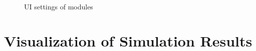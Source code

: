 \documentclass[fleqn,11pt,openany]{book}
\begin{document}
\begin{figure}
\caption{UI settings of modules}\label{fig:SimulationNetwork3}
\end{figure}

\section{Visualization of Simulation Results}
\end{document}
